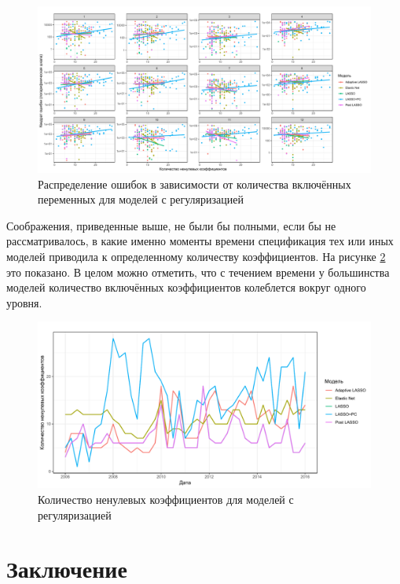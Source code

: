 \begin{figure}[hp]
    \centering
    \includegraphics[width = \textwidth]{nonzeroerror.pdf}
    \caption{Распределение ошибок в зависимости от количества включённых переменных для моделей с регуляризацией}
    \label{fig:nzerror}
\end{figure}

Соображения, приведенные выше, не были бы полными, если бы не рассматривалось, в какие именно моменты времени спецификация тех или иных моделей приводила к определенному количеству коэффициентов. На рисунке \ref{fig:nztime} это показано. В целом можно отметить, что с течением времени у большинства моделей количество включённых коэффициентов колеблется вокруг одного уровня.

\begin{figure}[hp]
    \centering
    \includegraphics[width = \textwidth]{nonzerotime.pdf}
    \caption{Количество ненулевых коэффициентов для моделей с регуляризацией}
    \label{fig:nztime}
\end{figure}

\chapter*{\textbf{Заключение}} \label{ch:final}


